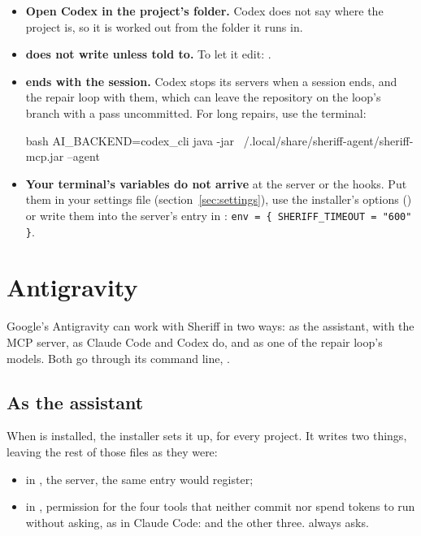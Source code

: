 \documentclass[11pt,a4paper]{article}
\begin{document}
\begin{itemize}
  \item \textbf{Open Codex in the project's folder.} Codex does not say where the
        project is, so it is worked out from the folder it runs in.
  \item \textbf{ does not write unless told to.} To let it
        edit: .
  \item \textbf{ ends with the session.} Codex stops its
        servers when a session ends, and the repair loop with them, which can
        leave the repository on the loop's branch with a pass uncommitted. For
        long repairs, use the terminal:
\begin{command}[basicstyle=\ttfamily\footnotesize]{bash}
AI_BACKEND=codex_cli java -jar ~/.local/share/sheriff-agent/sheriff-mcp.jar --agent
\end{command}
  \item \textbf{Your terminal's variables do not arrive} at the server or the
        hooks. Put them in your settings file (section~\ref{sec:settings}), use the
        installer's options () or write them into the server's entry in
        : \texttt{env = \{ SHERIFF\_TIMEOUT = "600" \}}.
\end{itemize}

\section{Antigravity}
\label{sec:antigravity}

Google's Antigravity can work with Sheriff in two ways: as the assistant, with
the MCP server, as Claude Code and Codex do, and as one of the repair loop's
models. Both go through its command line, .

\subsection{As the assistant}

When  is installed, the installer sets it up, for every project. It
writes two things, leaving the rest of those files as they were:

\begin{itemize}
  \item in , the server, the same entry
         would register;
  \item in , permission for the
        four tools that neither commit nor spend tokens to run without asking,
        as in Claude Code:  and the other
        three.  always asks.
\end{itemize}
\end{document}
